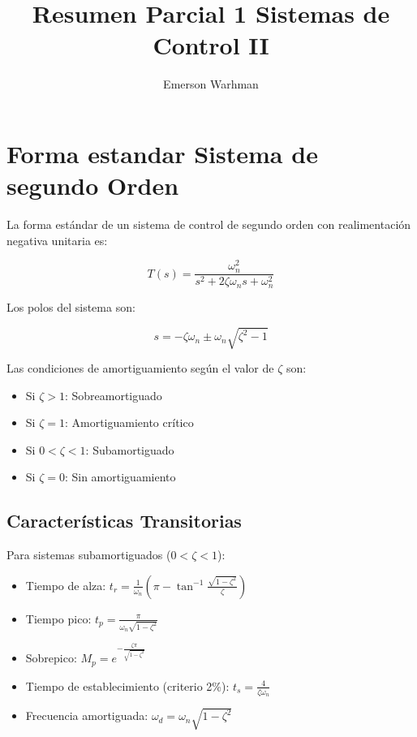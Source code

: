 \documentclass[legalpaper,twocolumn]{article}
\title{Resumen Parcial 1 Sistemas de Control II}
\author{Emerson Warhman}
\begin{document}
\maketitle

\section*{Forma estandar Sistema de segundo Orden}
La forma estándar de un sistema de control de segundo orden con realimentación negativa unitaria es:

\[ T(s) = \frac{\omega_n^2}{s^2 + 2\zeta \omega_n s + \omega_n^2} \]

Los polos del sistema son:

\[ s = -\zeta \omega_n \pm \omega_n \sqrt{\zeta^2 - 1} \]

Las condiciones de amortiguamiento según el valor de $\zeta$ son:

\begin{itemize}
    \item Si \(\zeta > 1\): Sobreamortiguado
    \item Si \(\zeta = 1\): Amortiguamiento crítico
    \item Si \(0 < \zeta < 1\): Subamortiguado
    \item Si \(\zeta = 0\): Sin amortiguamiento
\end{itemize}

\subsection*{Características Transitorias}

Para sistemas subamortiguados (\(0 < \zeta < 1\)):

\begin{itemize}
    \item Tiempo de alza: \( t_r = \frac{1}{\omega_n} \left( \pi - \tan^{-1} \frac{\sqrt{1-\zeta^2}}{\zeta} \right) \)
    \item Tiempo pico: \( t_p = \frac{\pi}{\omega_n \sqrt{1-\zeta^2}} \)
    \item Sobrepico: \( M_p = e^{-\frac{\zeta \pi}{\sqrt{1-\zeta^2}}} \)
    \item Tiempo de establecimiento (criterio 2\%): \( t_s = \frac{4}{\zeta \omega_n} \)
    \item Frecuencia amortiguada: \(\omega_d = \omega_n \sqrt{1-\zeta^2}\)
\end{itemize}
\end{document}
